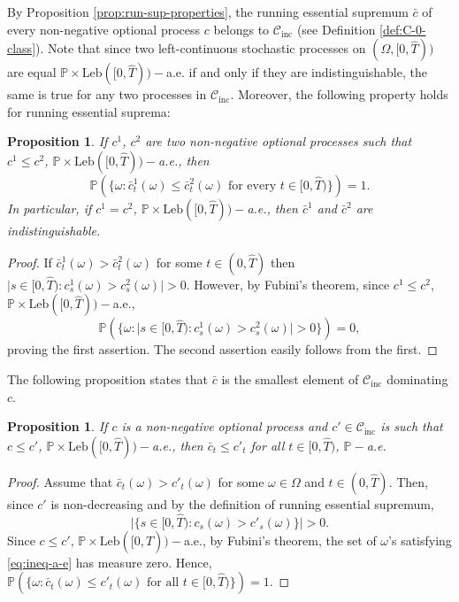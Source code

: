 \documentclass[11pt, oneside]{article}   	%
\theoremstyle{plain}
\newtheorem{prop}[thm]{Proposition}
\theoremstyle{definition}
\theoremstyle{remark}
\begin{document}
By Proposition \ref{prop:run-sup-properties}, the running essential supremum $\bar{c}$ of every non-negative optional process $c$ belongs to $\mathcal{C}_{\text{inc}}$ (see Definition \ref{def:C-0-class}). Note that since two left-continuous stochastic processes on $(\Omega,[0,\hat{T}))$ are equal $\mathbb{P}\times\text{Leb}([0,\hat{T}))-$a.e. if and only if they are indistinguishable, the same is true for any two processes in $\mathcal{C}_{\text{inc}}$. Moreover, the following property holds for running essential suprema:
\begin{prop}\label{prop:mon-of-sup}
If $c^1$, $c^2$ are two non-negative optional processes such that $c^1\leq c^2$, $\mathbb{P}\times\text{Leb}([0,\hat{T}))-$a.e., then
$$\mathbb{P}\left(\{\omega: \bar{c}^1_t(\omega)\leq\bar{c}^2_t(\omega)\text{ for every }t\in[0,\hat{T})\}\right)=1.$$
In particular, if $c^1=c^2$, $\mathbb{P}\times\text{Leb}([0,\hat{T}))-$a.e., then $\bar{c}^1$ and $\bar{c}^2$ are indistinguishable.
\end{prop}
\begin{proof}
If $\bar{c}^1_t(\omega)>\bar{c}^2_t(\omega)$ for some $t\in(0,\hat{T})$ then $\vert s\in [0,\hat{T}): c^1_s(\omega)>c^2_s(\omega)\vert>0$. However, by Fubini's theorem, since $c^1\leq c^2$, $\mathbb{P}\times\text{Leb}([0,\hat{T}))-$a.e.,
$$\mathbb{P}\left(\{\omega: \vert s\in[0,\hat{T}): c^1_s(\omega)>c^2_s(\omega)\vert>0\}\right)=0,$$
proving the first assertion. The second assertion easily follows from the first.
\end{proof}
The following proposition states that $\bar{c}$ is the smallest element of $\mathcal{C}_{\text{inc}}$ dominating $c$.
\begin{prop}\label{prop:minimality-of-c-bar}
If $c$ is a non-negative optional process and $c'\in\mathcal{C}_{\text{inc}}$ is such that $c\leq c'$, $\mathbb{P}\times\text{Leb}([0,\hat{T}))-$a.e., then $\bar{c}_t\leq c'_t$ for all $t\in [0,\hat{T})$, $\mathbb{P}-$a.e.
\end{prop}
\begin{proof}
Assume that $\bar{c}_t(\omega)>c'_t(\omega)$ for some $\omega\in\Omega$ and $t\in(0,\hat{T})$. Then, since $c'$ is non-decreasing and by the definition of running essential supremum,
\begin{equation}\label{eq:ineq-a-e}
\vert\{s\in[0,\hat{T}): c_s(\omega)>c'_s(\omega)\}\vert>0.
\end{equation}
Since $c\leq c'$, $\mathbb{P}\times\text{Leb}([0,\hat{T}))-$a.e., by Fubini's theorem, the set of $\omega$'s satisfying \eqref{eq:ineq-a-e} has measure zero. Hence,
$\mathbb{P}\left(\{\omega: \bar{c}_t(\omega)\leq c'_t(\omega)\text{ for all }t\in [0,\hat{T})\}\right)=1.$
\end{proof}
\end{document}
